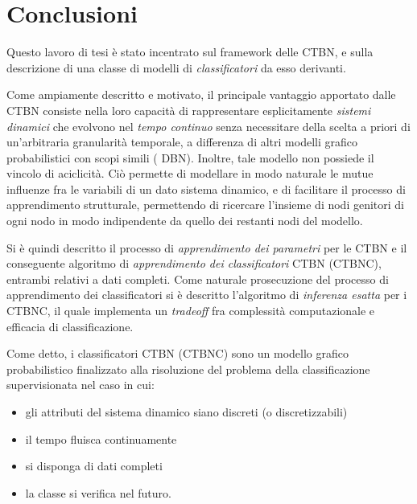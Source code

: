 
\cleardoublepage
{}
{}
\chapter*{Conclusioni}\label{cap:concl}
Questo lavoro di tesi è stato incentrato sul framework delle \acf{CTBN}, e sulla descrizione di una classe di modelli di \emph{classificatori} da esso derivanti.

Come ampiamente descritto e motivato, il principale vantaggio apportato dalle \acs{CTBN} consiste nella loro capacità di rappresentare esplicitamente \emph{sistemi dinamici} che evolvono nel \emph{tempo continuo} senza necessitare della scelta a priori di un'arbitraria granularità temporale, a differenza di altri modelli grafico probabilistici con scopi simili (\eg{} \acl{DBN}). Inoltre, tale modello non possiede il vincolo di aciclicità. Ciò permette di modellare in modo naturale le mutue influenze fra le variabili di un dato sistema dinamico, e di facilitare il processo di apprendimento strutturale, permettendo di ricercare l'insieme di nodi genitori di ogni nodo in modo indipendente da quello dei restanti nodi del modello.

Si è quindi descritto il processo di \emph{apprendimento dei parametri} per le \acs{CTBN} e il conseguente algoritmo di \emph{apprendimento dei classificatori} \acs{CTBN} (\acs{CTBNC}), entrambi relativi a dati completi. Come naturale prosecuzione del processo di apprendimento dei classificatori si è descritto l'algoritmo di \emph{inferenza esatta} per i \acs{CTBNC}, il quale implementa un \emph{tradeoff} fra complessità computazionale e efficacia di classificazione.

Come detto, i classificatori \acs{CTBN} (\acs{CTBNC}) sono un modello grafico probabilistico finalizzato alla risoluzione del problema della classificazione supervisionata nel caso in cui:
\begin{itemize}
	\item gli attributi del sistema dinamico siano discreti (o discretizzabili)
	\item il tempo fluisca continuamente
	\item si disponga di dati completi
	\item la classe si verifica nel futuro.
\end{itemize}

